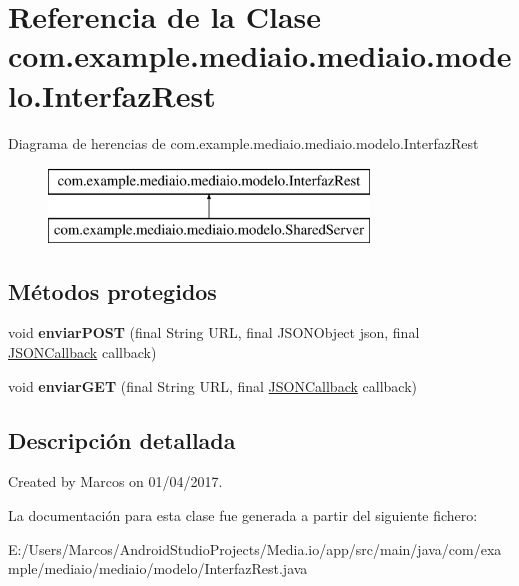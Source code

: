 \hypertarget{classcom_1_1example_1_1mediaio_1_1mediaio_1_1modelo_1_1_interfaz_rest}{}\section{Referencia de la Clase com.\+example.\+mediaio.\+mediaio.\+modelo.\+Interfaz\+Rest}
\label{classcom_1_1example_1_1mediaio_1_1mediaio_1_1modelo_1_1_interfaz_rest}
Diagrama de herencias de com.\+example.\+mediaio.\+mediaio.\+modelo.\+Interfaz\+Rest\begin{figure}[H]
\begin{center}
\leavevmode
\includegraphics[height=2.000000cm]{classcom_1_1example_1_1mediaio_1_1mediaio_1_1modelo_1_1_interfaz_rest}
\end{center}
\end{figure}
\subsection*{Métodos protegidos}
\begin{DoxyCompactItemize}
\item 
\mbox{\label{classcom_1_1example_1_1mediaio_1_1mediaio_1_1modelo_1_1_interfaz_rest_aa8a213a667ad5f0cc7ef8af1aedebb6c}} 
void {\bfseries enviar\+P\+O\+ST} (final String U\+RL, final J\+S\+O\+N\+Object json, final \hyperlink{classcom_1_1example_1_1mediaio_1_1mediaio_1_1modelo_1_1_j_s_o_n_callback}{J\+S\+O\+N\+Callback} callback)
\item 
\mbox{\label{classcom_1_1example_1_1mediaio_1_1mediaio_1_1modelo_1_1_interfaz_rest_afd3b5f37bb77a9d6921038e7675869fe}} 
void {\bfseries enviar\+G\+ET} (final String U\+RL, final \hyperlink{classcom_1_1example_1_1mediaio_1_1mediaio_1_1modelo_1_1_j_s_o_n_callback}{J\+S\+O\+N\+Callback} callback)
\end{DoxyCompactItemize}


\subsection{Descripción detallada}
Created by Marcos on 01/04/2017. 

La documentación para esta clase fue generada a partir del siguiente fichero\+:\begin{DoxyCompactItemize}
\item 
E\+:/\+Users/\+Marcos/\+Android\+Studio\+Projects/\+Media.\+io/app/src/main/java/com/example/mediaio/mediaio/modelo/Interfaz\+Rest.\+java\end{DoxyCompactItemize}
